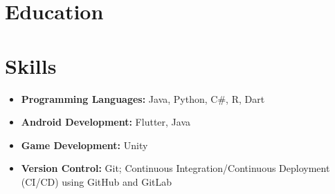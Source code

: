 \documentclass{resume_class}
\begin{document}
\section{Education}


\section{Skills}
\begin{itemize}[leftmargin = 10pt , labelsep = 3pt , parsep = 0pt , itemsep = 2pt , label =  {\small $\bullet$} ] 
	\item \textbf{Programming Languages:} Java, Python, C\#, R, Dart
    \item \textbf{Android Development:} Flutter, Java
    \item \textbf{Game Development:} Unity
    \item \textbf{Version Control:} Git; Continuous Integration/Continuous Deployment (CI/CD) using GitHub and GitLab
\end{itemize}


		
\end{document}
